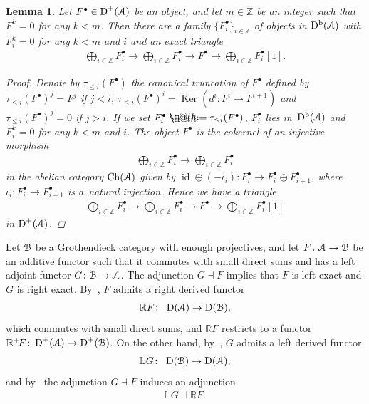 \documentclass[11pt]{article}
\makeatletter
\numberwithin{equation}{section}
\newtheorem{lem}[dfn]{Lemma}
\newcommand*{\defeq}{\mathrel{\rlap{%
 \raisebox{0.3ex}{$\m@th\cdot$}}%
 \raisebox{-0.3ex}{$\m@th\cdot$}}%
 =}
\numberwithin{equation}{section}
\newcommand{\Ch}{\operatorname{Ch}}
\newcommand{\Db}{\operatorname{D^b}}
\newcommand{\D}{\operatorname{D}}
\newcommand{\id}{\operatorname{id}}
\newcommand{\Ker}{\operatorname{Ker}}
\newcommand{\bL}{\mathbb{L}}
\newcommand{\bR}{\mathbb{R}}
\newcommand{\bZ}{\mathbb{Z}}
\newcommand{\scrA}{\EuScript{A}}
\newcommand{\scrB}{\EuScript{B}}
\makeatother
\begin{document}
\begin{lem}\label{canonical truncation}
Let $F^{\bullet}\in \D^+(\scrA)$ be an object, and let $m\in \bZ$ be an integer such that $F^k=0$ for any $k<m$. Then there are a family $\{F^{\bullet}_i\}_{i\in \bZ}$ of objects in $\Db(\scrA)$ with $F^{k}_i=0$ for any $k<m$ and $i$ and an exact triangle
\begin{gather*}
\bigoplus_{i\in \bZ}F^{\bullet}_i\to \bigoplus_{i\in \bZ}F^{\bullet}_i\to F^{\bullet}\to \bigoplus_{i\in \bZ}F^{\bullet}_i[1].
\end{gather*}
\begin{proof}
Denote by $\tau_{\leq i}(F^{\bullet})$ the canonical truncation of $F^{\bullet}$ defined by $\tau_{\leq i}(F^{\bullet})^j=F^j$ if $j<i$, $\tau_{\leq i}(F^{\bullet})^i=\Ker(d^i\colon F^i\to F^{i+1})$ and $\tau_{\leq i}(F^{\bullet})^j=0$ if $j>i$. If we set $F_i^{\bullet}\defeq \tau_{\leq i}(F^{\bullet})$, $F_i^{\bullet}$ lies in~$\Db(\scrA)$ and $F^{k}_i=0$ for any $k<m$ and $i$. The object $F^{\bullet}$ is the cokernel of an injective morphism
\begin{gather*}
\bigoplus_{i\in \bZ} F^{\bullet}_i\to \bigoplus_{i\in \bZ} F^{\bullet}_i
\end{gather*}
in the abelian category $\Ch(\scrA)$ given by
 $\id \oplus (-\iota_i)\colon F^{\bullet}_i\to F^{\bullet}_i\oplus F^{\bullet}_{i+1}$, where $\iota_i\colon F^{\bullet}_i\to F^{\bullet}_{i+1}$ is a~natural injection. Hence we have a triangle
\begin{gather*}
\bigoplus_{i\in \bZ}F^{\bullet}_i\to \bigoplus_{i\in \bZ}F^{\bullet}_i\to F^{\bullet}\to \bigoplus_{i\in \bZ}F^{\bullet}_i[1]
\end{gather*}
in $\D^+(\scrA)$.
\end{proof}
\end{lem}

Let $\scrB$ be a Grothendieck category with enough projectives, and let $F\colon \scrA\to\scrB$ be an addi\-tive functor such that it commutes with small direct sums and has a left adjoint functor $G\colon \scrB\to \scrA$. The adjunction $G\dashv F$ implies that $F$ is left exact and $G$ is right exact. By~\cite[Proposition~14.3.4]{ks2}, $F$ admits a right derived functor
 \begin{gather*}
 \bR F\colon\ \D(\scrA)\to \D(\scrB),
 \end{gather*}
 which commutes with small direct sums, and $ \bR F$ restricts to a functor $\bR^+\!F\colon \D^+(\scrA)\to \D^+(\scrB)$. On the other hand, by~\cite[Theorem~14.4.3]{ks2}, $G$ admits a left derived functor
 \begin{gather*}
 \bL G\colon\ \D(\scrB)\to \D(\scrA),
 \end{gather*}
 and by~\cite[Theorem~14.4.5]{ks2} the adjunction $G\dashv F$ induces an adjunction
 \begin{gather*}
 \bL G\dashv \bR F.
 \end{gather*}
\end{document}

